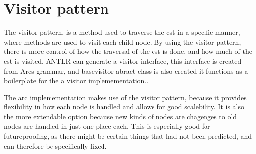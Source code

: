 \section{Visitor pattern}\label{sec:visitorpattern}


The visitor pattern, is a method used to traverse the \gls{cst} in a specific manner, where methods are used to visit each child node. By using the visitor pattern, there is more control of how the traversal of the \gls{cst} is done, and how much of the \gls{cst} is visited. ANTLR can generate a visitor interface, this interface is created from Arcs grammar, and basevisitor abract class is also created it functions as a boilerplate for the a visitor implemementation.\cite{Parr2014}.

The arc implemementation makes use of the visitor pattern, because it provides flexibility in how each node is handled and allows for good scalebility. It is also the more extendable option because new kinds of nodes are chagenges to old nodes are handled in just one place each. This is especially good for futureproofing, as there might be certain things that had not been predicted, and can therefore be specifically fixed.

